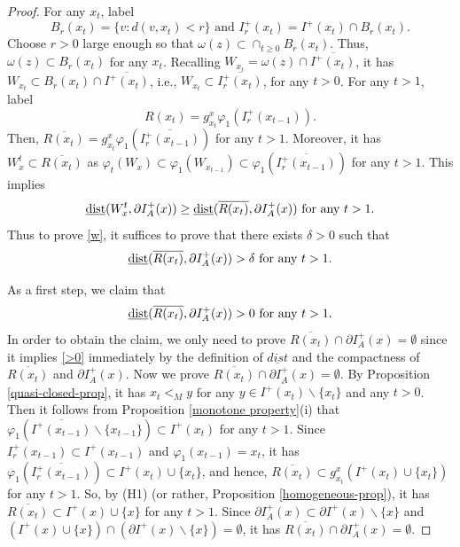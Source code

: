 \documentclass[a4paper,11pt]{article}
\theoremstyle{plain}
\theoremstyle{definition}
\numberwithin{equation}{section}
\begin{document}
\begin{proof}
    For any $x_t$, label $$B_{r}(x_t)=\{v: d(v,x_t)< r\}\text{ and }I^{+}_{r}(x_t)=I^{+}(x_t)\cap B_{r}(x_t).$$
    Choose $r>0$ large enough so that $\omega(z)\subset \cap_{t\geq0} B_{r}(x_t)$. Thus, $\omega(z)\subset B_{r}(x_t)$ for any $x_t$. Recalling $W_{x_t}=\omega(z)\cap\overline{I^{+}(x_t)}$, it has $W_{x_t}\subset B_{r}(x_t)\cap\overline{I^{+}(x_t)}$, i.e., $W_{x_t}\subset \overline{I^{+}_{r}(x_t)}$, for any $t>0$. For any $t>1$, label $$R(x_t)=g_{x_{t}}^{x}\varphi_1 (I^{+}_{r}(x_{t-1})).$$ Then, $\overline{R(x_t)}=g_{x_{t}}^{x}\varphi_1 (\overline{I^{+}_{r}(x_{t-1})})$ for any $t>1$. Moreover, it has $W_x^t\subset \overline{R(x_t)}$ as 
	$\varphi_{t} (W_x)\subset \varphi_1 (W_{x_{t-1}})\subset \varphi_1 (\overline{I^{+}_{r}(x_{t-1})})$ for any $t>1$. This implies 
    \begin{equation*}\label{d>d}
		{\rm \underline{dist}}(W_{x}^{t},\partial  I^{+}_{A}(x))\geq {\rm\underline{dist}}(\overline{R(x_t)}, \partial  I^{+}_{A}(x)) \text{ for any } t>1.
	\end{equation*}
    Thus to prove \eqref{w}, it suffices to prove that there exists $\delta>0$ such that 
    \begin{equation}\label{>delta}
        {\rm\underline{dist}}(\overline{R(x_t)},\partial  I^{+}_{A}(x))>\delta \text{ for any }t>1.
    \end{equation}

    As a first step, we claim that 
    \begin{equation}\label{>0}
        {\rm\underline{dist}}(\overline{R(x_t)},\partial  I^{+}_{A}(x))>0 \text{ for any }t>1.
    \end{equation}
    In order to obtain the claim, we only need to prove $\overline{R(x_t)}\cap\partial  I^{+}_{A}(x)=\emptyset$ since it implies \eqref{>0} immediately by the definition of $\underline{dist}$ and the compactness of $\overline{R(x_t)}$ and $\partial  I^{+}_{A}(x)$. Now we prove $\overline{R(x_t)}\cap\partial  I^{+}_{A}(x)=\emptyset$. By Proposition \ref{quasi-closed-prop}, it has $x_{t}<_M y$ for any $y\in \overline{I^{+}(x_{t})}\backslash\{x_{t}\}$ and any $t>0$. Then it follows from Proposition \ref{monotone property}(i) that $\varphi_1  (\overline{I^{+}(x_{t-1})}\backslash\{x_{t-1}\})\subset  I^{+}(x_{t})$ for any $t>1$. Since $I^{+}_{r}(x_{t-1})\subset I^{+}(x_{t-1})$ and $\varphi_1(x_{t-1})=x_{t}$, it has $\varphi_1(\overline{I^{+}_{r}(x_{t-1})})\subset  I^{+}(x_{t})\cup \{x_{t}\}$, and hence, $\overline{R(x_t)}\subset g_{x_{t}}^{x}(I^{+}(x_{t})\cup \{x_{t}\})$ for any $t>1$. So, by (H1) (or rather, Proposition \ref{homogeneous-prop}), it has  $\overline{R(x_t)}\subset I^{+}(x)\cup \{x\}$ for any $t>1$. Since $\partial  I^{+}_{A}(x)\subset\partial  I^{+}(x)\backslash\{x\}$ and $( I^{+}(x)\cup\{x\})\cap (\partial  I^{+}(x)\backslash\{x\})=\emptyset$, it has $\overline{R(x_t)}\cap\partial  I^{+}_{A}(x)=\emptyset$.


\end{proof}
\end{document}
